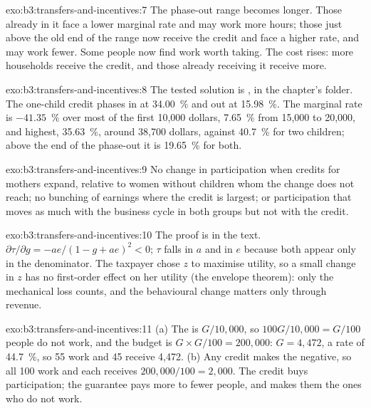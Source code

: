 \begin{solution}{exo:b3:transfers-and-incentives:7}
The phase-out range becomes longer. Those already in it face a lower marginal rate
and may work more hours; those just above the old end of the range now receive
the credit and face a higher rate, and may work fewer. Some people now find work
worth taking. The cost rises: more households receive the credit, and those already
receiving it receive more.
\end{solution}

\begin{solution}{exo:b3:transfers-and-incentives:8}
The tested solution is , in the chapter's 
folder. The one-child credit phases in at 34.00~\% and out at 15.98~\%. The marginal rate
is $-41.35$~\% over most of the first 10{,}000 dollars, 7.65~\% from 15{,}000 to 20{,}000, and highest,
35.63~\%, around 38{,}700 dollars, against 40.7~\% for two children; above the end of the
phase-out it is 19.65~\% for both. %
\end{solution}

\begin{solution}{exo:b3:transfers-and-incentives:9}
No change in participation when credits for mothers expand, relative to women
without children whom the change does not reach; no bunching of earnings where the
credit is largest; or participation that moves as much with the business cycle in
both groups but not with the credit.
\end{solution}

\begin{solution}{exo:b3:transfers-and-incentives:10}
The proof is in the text. $\partial\tau/\partial g = -ae/(1 - g + ae)^2 < 0$; $\tau$ falls in $a$ and in $e$ because both
appear only in the denominator. The taxpayer chose $z$ to maximise utility, so a
small change in $z$ has no first-order effect on her utility (the envelope theorem):
only the mechanical loss counts, and the behavioural change matters only through
revenue.
\end{solution}

\begin{solution}{exo:b3:transfers-and-incentives:11}
(a) The  is $G/10{,}000$, so $100G/10{,}000 = G/100$ people do not work, and the
budget is $G \times G/100 = 200{,}000$: $G = 4{,}472$, a rate of 44.7~\%, so 55 work and 45 receive 4{,}472.
(b) Any credit makes the  negative, so all 100 work and each
receives $200{,}000/100 = 2{,}000$. The credit buys participation; the guarantee pays more to
fewer people, and makes them the ones who do not work.
\end{solution}

